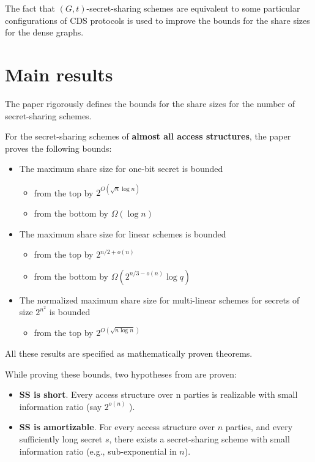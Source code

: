 The fact that $(G,t)$-secret-sharing schemes are equivalent to some particular configurations of CDS protocols is used to improve the bounds for the share sizes for the dense graphs.

\section{Main results}

The paper rigorously defines the bounds for the share sizes for the number of secret-sharing schemes.

For the secret-sharing schemes of \textbf{almost all access structures}, the paper proves the following bounds:

\begin{itemize}
    \item The maximum share size for one-bit secret is bounded 
    \begin{itemize}
        \item from the top by $2^{O(\sqrt{n}\log n)}$
        \item from the bottom by $\Omega(\log n)$
    \end{itemize}
    \item The maximum share size for linear schemes is bounded
    \begin{itemize}
        \item from the top by $2^{n/2+o(n)}$
        \item from the bottom by $\Omega(2^{n/3-o(n)}\log q)$
    \end{itemize}
    \item The normalized maximum share size for multi-linear schemes for secrets of size $2^{n^2}$ is bounded
    \begin{itemize}
        \item from the top by $2^{O(\sqrt{n \log n})}$
    \end{itemize}
\end{itemize}

All these results are specified as mathematically proven theorems.

While proving these bounds, two hypotheses from \cite{applebaumAmortization} are proven:

\begin{itemize}
    \item \textbf{SS is short}. Every access structure over n parties is realizable with small information ratio (say $2^{o(n)}$ ).
    \item \textbf{SS is amortizable}. For every access structure over $n$ parties, and every sufficiently long secret $s$, 
            there exists a secret-sharing scheme with small information ratio (e.g., sub-exponential in $n$).
\end{itemize}

